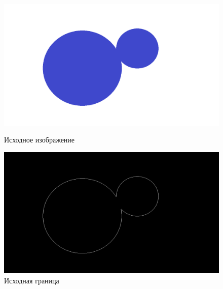 \begin{figure}[!htb]
    \includegraphics[width=\linewidth]{../img/original/3.png}
    \caption{Исходное изображение}
    \endminipage\hfill
    \includegraphics[width=\linewidth]{../img/outputs/divide_objects/border_img.jpg}
    \caption{Исходная граница}
    \endminipage\hfill
\end{figure}


